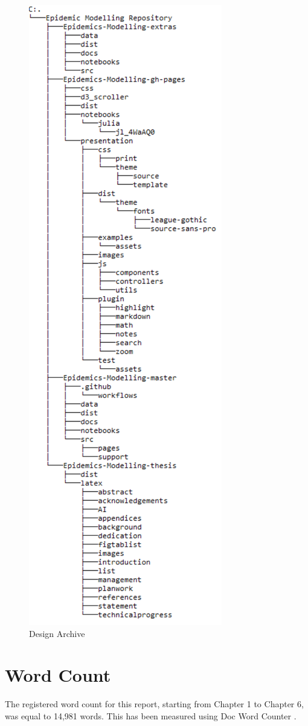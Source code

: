 \begin{appendices}
\begin{figure}[ht!]
    \includegraphics[page=1,scale=0.76]{latex/images/archive.pdf}
    \vspace*{-2mm}
    \caption{Design Archive}%
\end{figure}

\clearpage


\section{Word Count}
\label{count}

The registered word count for this report, starting from Chapter 1 to Chapter 6, was equal to 14,981 words.  This has been measured using Doc Word Counter \cite{count_w}.

\end{appendices}